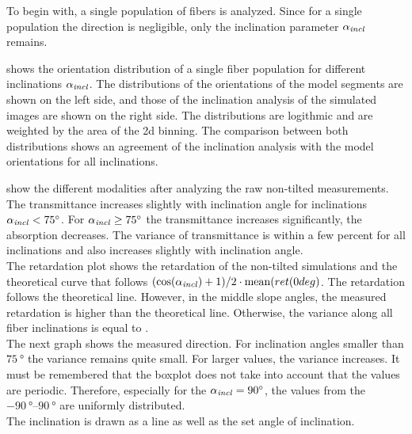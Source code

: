 % 
To begin with, a single population of fibers is analyzed.
Since for a single population the direction is negligible, only the inclination parameter $\textnormal{$\alpha_{\mathit{incl}}$}{}$ remains.
\par
% 
 shows the orientation distribution of a single fiber population for different inclinations $\textnormal{$\alpha_{\mathit{incl}}$}{}$.
The distributions of the orientations of the model segments are shown on the left side, and those of the inclination analysis of the simulated images are shown on the right side.
The distributions are logithmic and are weighted by the area of the 2d binning.
The comparison between both distributions shows an agreement of the inclination analysis with the model orientations for all inclinations.
\par
% 
% 
% 
% 
 show the different modalities after analyzing the raw non-tilted measurements.
The transmittance increases slightly with inclination angle for inclinations $\textnormal{$\alpha_{\mathit{incl}}$}<\SI{75}{\degree}$.
For $\textnormal{$\alpha_{\mathit{incl}}$} \ge \SI{75}{\degree}$ the transmittance increases significantly, \ie{} the absorption decreases.
The variance of transmittance is within a few percent for all inclinations and also increases slightly with inclination angle.
\\
% 
The retardation plot shows the retardation of the non-tilted simulations and the theoretical curve that follows $(\cos(\textnormal{$\alpha_{\mathit{incl}}$}) + 1) / 2 \cdot \mathrm{mean}(ret(0 deg)$.
The retardation follows the theoretical line.
However, in the middle slope angles, the measured retardation is higher than the theoretical line.
Otherwise, the variance along all fiber inclinations is equal to \modelInc{}.
\\
% 
The next graph shows the measured direction.
For inclination angles smaller than $\SI{75}{\degree}$ the variance remains quite small.
For larger values, the variance increases.
It must be remembered that the boxplot does not take into account that the values are periodic.
Therefore, especially for the $\textnormal{$\alpha_{\mathit{incl}}$}=\SI{90}{\degree}$, the values from the $\SIrange{-90}{90}{\degree}$ are uniformly distributed.
\\
% 
The inclination is drawn as a line as well as the set angle of inclination.
